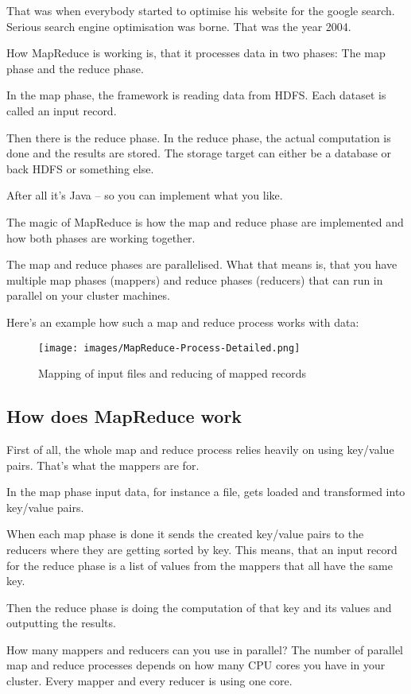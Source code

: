 \documentclass[12pt, numbers=noenddot]{scrreprt} %
\begin{document}
That was when everybody started to optimise his website for the google search. Serious search engine optimisation was borne. That was the year 2004.

How MapReduce is working is, that it processes data in two phases: The map phase and the reduce phase.

In the map phase, the framework is reading data from HDFS. Each dataset is called an input record.

Then there is the reduce phase. In the reduce phase, the actual computation is done and the results are stored. The storage target can either be a database or back HDFS or something else.

After all it’s Java – so you can implement what you like.

The magic of MapReduce is how the map and reduce phase are implemented and how both phases are working together.

The map and reduce phases are parallelised. What that means is, that you have multiple map phases (mappers) and reduce phases (reducers) that can run in parallel on your cluster machines.

Here's an example how such a map and reduce process works with data:

\begin{figure}[htbp]
  \centering
     \texttt{[image: images/MapReduce-Process-Detailed.png]}
  \caption{Mapping of input files and reducing of mapped records}
  \label{fig:Bild1}
\end{figure}

\subsection{How does MapReduce work}

First of all, the whole map and reduce process relies heavily on using key/value pairs. That’s what the mappers are for.

In the map phase input data, for instance a file, gets loaded and transformed into key/value pairs.

When each map phase is done it sends the created key/value pairs to the reducers where they are getting sorted by key. This means, that an input record for the reduce phase is a list of values from the mappers that all have the same key.

Then the reduce phase is doing the computation of that key and its values and outputting the results.

How many mappers and reducers can you use in parallel? The number of parallel map and reduce processes depends on how many CPU cores you have in your cluster. Every mapper and every reducer is using one core.
\end{document}
